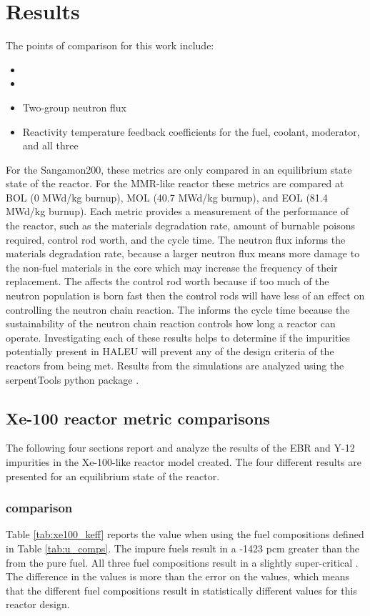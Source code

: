 \section{Results}
The points of comparison for this work include:
\begin{itemize} 
        \item \keff 
        \item \betaEff
        \item Two-group neutron flux
        \item Reactivity temperature feedback coefficients for the fuel, coolant, 
              moderator, and all three
\end{itemize}

For the Sangamon200, these metrics are only compared in an equilibrium state
state of the reactor. For the \gls{MMR}-like reactor these metrics 
are compared at \gls{BOL} (0 MWd/kg burnup), \gls{MOL} (40.7 MWd/kg burnup), 
and \gls{EOL} (81.4 MWd/kg burnup). Each metric provides a 
measurement of the performance of 
the reactor, such as the materials degradation rate, amount of burnable 
poisons required, control rod worth, and the cycle time. The neutron flux 
informs the materials degradation rate, because a larger neutron flux 
means more damage to the non-fuel materials in the core which may increase 
the frequency of their replacement. The \betaEff affects the control rod 
worth because if too much of the neutron population is born fast then 
the control rods will have less of an effect on controlling the neutron 
chain reaction. The \keff informs the cycle time because the sustainability 
of the neutron chain reaction controls how long a reactor can operate. 
Investigating 
each of these results helps to determine if the impurities potentially 
present in \gls{HALEU} will prevent any of the design criteria of the 
reactors from being met. Results from the simulations are analyzed using 
the serpentTools python package \cite{johnson_serpenttools_2020}. 

\subsection{Xe-100 reactor metric comparisons}
The following four sections report and analyze the results of the 
\gls{EBR} and Y-12 impurities in the Xe-100-like reactor model 
created. The four different results are presented for an 
equilibrium state of the reactor.

\subsubsection{\keff comparison}
Table \ref{tab:xe100_keff} reports the \keff value when using the fuel 
compositions defined in Table \ref{tab:u_comps}. The impure fuels 
result in a -1423 pcm 
greater than the \keff from the pure fuel. All three fuel compositions 
result in a slightly super-critical \keff. The difference in the \keff 
values is more than the error on the values, which means that the 
different fuel compositions result in statistically different \keff 
values for this reactor design. 

